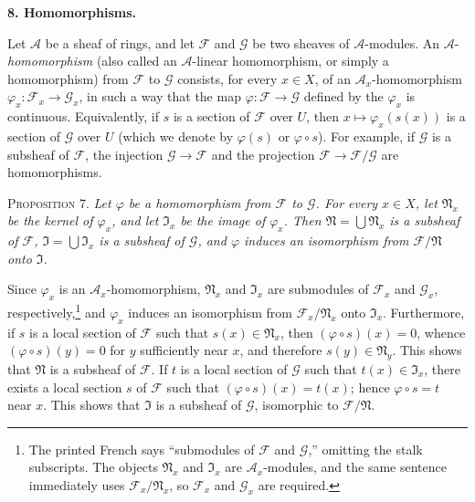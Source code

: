 
\medskip
{}\label{fac:I:1:no:8}
\textbf{8. Homomorphisms.}

Let $\mathcal{A}$ be a sheaf of rings, and let $\mathcal{F}$ and $\mathcal{G}$ be two sheaves of $\mathcal{A}$-modules. An $\mathcal{A}$-\textit{homomorphism} (also called an $\mathcal{A}$-linear homomorphism, or simply a homomorphism) from $\mathcal{F}$ to $\mathcal{G}$ consists, for every $x\in X$, of an $\mathcal{A}_x$-homomorphism $\varphi_x:\mathcal{F}_x\to\mathcal{G}_x$, in such a way that the map $\varphi:\mathcal{F}\to\mathcal{G}$ defined by the $\varphi_x$ is continuous. Equivalently, if $s$ is a section of $\mathcal{F}$ over $U$, then $x\mapsto\varphi_x(s(x))$ is a section of $\mathcal{G}$ over $U$ (which we denote by $\varphi(s)$ or $\varphi\circ s$). For example, if $\mathcal{G}$ is a subsheaf of $\mathcal{F}$, the injection $\mathcal{G}\to\mathcal{F}$ and the projection $\mathcal{F}\to\mathcal{F}/\mathcal{G}$ are homomorphisms.

\medskip
{}\label{fac:I:1:no:8:prop:7}
\textsc{Proposition 7.} \textit{Let $\varphi$ be a homomorphism from $\mathcal{F}$ to $\mathcal{G}$. For every $x\in X$, let $\mathfrak{N}_x$ be the kernel of $\varphi_x$, and let $\mathfrak{I}_x$ be the image of $\varphi_x$. Then $\mathfrak{N}=\bigcup\mathfrak{N}_x$ is a subsheaf of $\mathcal{F}$, $\mathfrak{I}=\bigcup\mathfrak{I}_x$ is a subsheaf of $\mathcal{G}$, and $\varphi$ induces an isomorphism from $\mathcal{F}/\mathfrak{N}$ onto $\mathfrak{I}$.}

Since $\varphi_x$ is an $\mathcal{A}_x$-homomorphism, $\mathfrak{N}_x$ and $\mathfrak{I}_x$ are submodules of $\mathcal{F}_x$ and $\mathcal{G}_x$, respectively,\footnote{The printed French says ``submodules of $\mathcal{F}$ and $\mathcal{G}$,'' omitting the stalk subscripts. The objects $\mathfrak{N}_x$ and $\mathfrak{I}_x$ are $\mathcal{A}_x$-modules, and the same sentence immediately uses $\mathcal{F}_x/\mathfrak{N}_x$, so $\mathcal{F}_x$ and $\mathcal{G}_x$ are required.} and $\varphi_x$ induces an isomorphism from $\mathcal{F}_x/\mathfrak{N}_x$ onto $\mathfrak{I}_x$. Furthermore, if $s$ is a local section of $\mathcal{F}$ such that $s(x)\in\mathfrak{N}_x$, then $(\varphi\circ s)(x)=0$, whence $(\varphi\circ s)(y)=0$ for $y$ sufficiently near $x$, and therefore $s(y)\in\mathfrak{N}_y$. This shows that $\mathfrak{N}$ is a subsheaf of $\mathcal{F}$. If $t$ is a local section of $\mathcal{G}$ such that $t(x)\in\mathfrak{I}_x$, there exists a local section $s$ of $\mathcal{F}$ such that $(\varphi\circ s)(x)=t(x)$; hence $\varphi\circ s=t$ near $x$. This shows that $\mathfrak{I}$ is a subsheaf of $\mathcal{G}$, isomorphic to $\mathcal{F}/\mathfrak{N}$.

